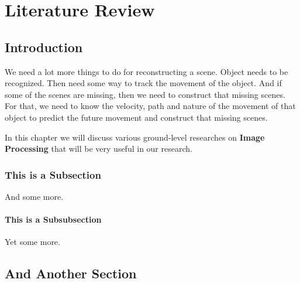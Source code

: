 \chapter{Literature Review}\label{review}


\section{Introduction}
We need a lot more things to do for reconstructing a scene. Object needs to be recognized. Then need some way to track the movement of the object. And if some of the scenes are missing, then we need to construct that missing scenes. For that, we need to know the velocity, path and nature of the movement of that object to predict the future movement and construct that missing scenes.

In this chapter we will discuss various ground-level researches on \textbf{Image Processing} that will be very useful in our research. 


\subsection{This is a Subsection}
And some more.
\subsubsection{This is a Subsubsection}
Yet some more.

\section{And Another Section}




\endinput
